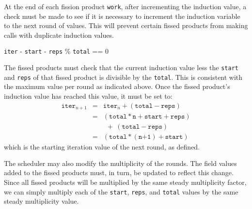 At the end of each fission product \texttt{work}, after incrementing the 
induction value, a check must be made to see if it is necessary to increment 
the induction variable to the next round of  values.  This will prevent certain
fissed products from making calls with duplicate induction values.  
\begin{center}
\texttt{iter} - \texttt{start} - \texttt{reps} \% \texttt{total} == 0
\end{center}
The fissed products must check that the current induction value less the 
\texttt{start} and \texttt{reps} of that fissed product is divisible by the 
\texttt{total}.  This is consistent with the maximum value per round as 
indicated above.  Once the fissed product's induction value has reached 
this value, it must be set to:
\begin{eqnarray*}
\texttt{iter}_{n+1} &=& \texttt{iter}_{n} + (\texttt{total} - \texttt{reps}) \\
&=& (\texttt{total}*\texttt{n} + \texttt{start} + \texttt{reps}) \\
&&  \ \ +\ (\texttt{total} - \texttt{reps}) \\
&=& (\texttt{total}*(\texttt{n+1}) + \texttt{start})
\end{eqnarray*}
which is the starting iteration value of the next round, as defined.

The scheduler may also modify the multiplicity of the rounds.  The field values
added to the fissed products must, in turn, be updated to reflect this change.
Since all fissed products will be multiplied by the same steady multiplicity
factor, we can simply multiply each of the \texttt{start}, \texttt{reps}, and 
\texttt{total} values by the same steady multiplicity value.


